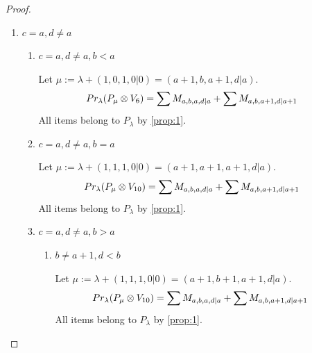 \begin{proof}
\begin{enumerate}
\item $c=a, d \neq a$ \par
\begin{enumerate}
\item $c=a, d \neq a, b<a$ \par
        Let $\mu:=\lambda + (1,0,1,0|0) = (a+1,b,a+1,d|a) $.
        \begin{equation}\notag
          \begin{aligned}
            Pr_{\lambda}(P_\mu \otimes V_{6}) &=
\sum M_{a,b,a,d|a}
+ \sum M_{a,b,a+1,d|a+1}
          \end{aligned}
        \end{equation}
All items belong to $P_\lambda$ by \cref{prop:1}.

\item $c=a, d \neq a, b=a $ \par 
        Let $\mu:=\lambda + (1,1,1,0|0) = (a+1,a+1,a+1,d|a) $.
        \begin{equation}\notag
          \begin{aligned}
            Pr_{\lambda}(P_\mu \otimes V_{10}) &=
\sum M_{a,b,a,d|a}
+ \sum M_{a,b,a+1,d|a+1}
          \end{aligned}
        \end{equation}
All items belong to $P_\lambda$ by \cref{prop:1}.

\item $c=a, d \neq a, b>a $ 
  \begin{enumerate}
      \item $ b \neq a+1 , d<b $ \par
        Let $\mu:=\lambda + (1,1,1,0|0) = (a+1,b+1,a+1,d|a) $.
        \begin{equation}\notag
          \begin{aligned}
            Pr_{\lambda}(P_\mu \otimes V_{10}) &=
\sum M_{a,b,a,d|a}
+ \sum M_{a,b,a+1,d|a+1}
          \end{aligned}
        \end{equation}
All items belong to $P_\lambda$ by \cref{prop:1}.


\end{enumerate}
\end{enumerate}
\end{enumerate}
\end{proof}
